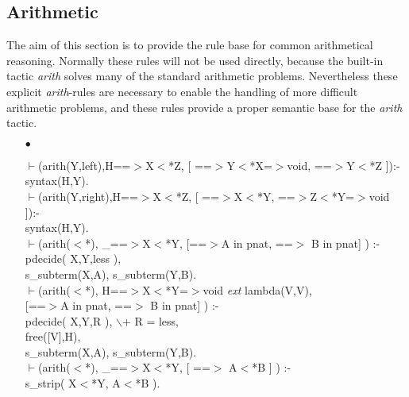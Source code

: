 \documentclass[11pt]{report}
\begin{document}
 \subsection{Arithmetic}
 The aim of this section is to provide the rule base
 for common arithmetical reasoning. Normally these rules
 will not be used directly, because the built-in tactic
 \emph{arith} solves many of the standard arithmetic problems.
 Nevertheless these explicit \emph{arith}-rules are necessary
 to enable the handling of more difficult arithmetic problems,
 and these rules provide a proper semantic base for the 
 \emph{arith} tactic.  
 \begin{enumerate}
 \item[$\bullet$]
\begin{sf}\begin{tabbing}
$\vdash$(arith(Y,left),H==$>$X$<$*Z, [ ==$>$Y$<$*X=$>$void, ==$>$Y$<$*Z ]):-\\[-0.15ex]
\hspace{2em}syntax(H,Y).\\[-0.15ex]
$\vdash$(arith(Y,right),H==$>$X$<$*Z, [ ==$>$X$<$*Y, ==$>$Z$<$*Y=$>$void ]):-\\[-0.15ex]
\hspace{2em}syntax(H,Y).\\[-0.15ex]
$\vdash$(arith($<$*), \_\hspace{0.1em}==$>$X$<$*Y, [==$>$A in pnat, ==$>$ B in pnat] ) :-\\[-0.15ex]
\hspace{2em}pdecide( X,Y,less ),\\[-0.15ex]
\hspace{2em}s\_\hspace{0.1em}subterm(X,A), s\_\hspace{0.1em}subterm(Y,B).\\[-0.15ex]
$\vdash$(arith($<$*), H==$>$X$<$*Y=$>$void \mbox{\it ext} lambda(V,V),\\[-0.15ex]
\hspace{8em}[==$>$A in pnat, ==$>$ B in pnat] ) :-\\[-0.15ex]
\hspace{2em}pdecide( X,Y,R ), $\backslash$+ R = less,\\[-0.15ex]
\hspace{2em}free([V],H),\\[-0.15ex]
\hspace{2em}s\_\hspace{0.1em}subterm(X,A), s\_\hspace{0.1em}subterm(Y,B).\\[-0.15ex]
$\vdash$(arith($<$*), \_\hspace{0.1em}==$>$X$<$*Y, [ ==$>$ A$<$*B ] ) :-\\[-0.15ex]
\hspace{2em}s\_\hspace{0.1em}strip( X$<$*Y, A$<$*B ).
\end{tabbing}\end{sf}

  
 \end{enumerate}
 \pagebreak
  
\end{document}
